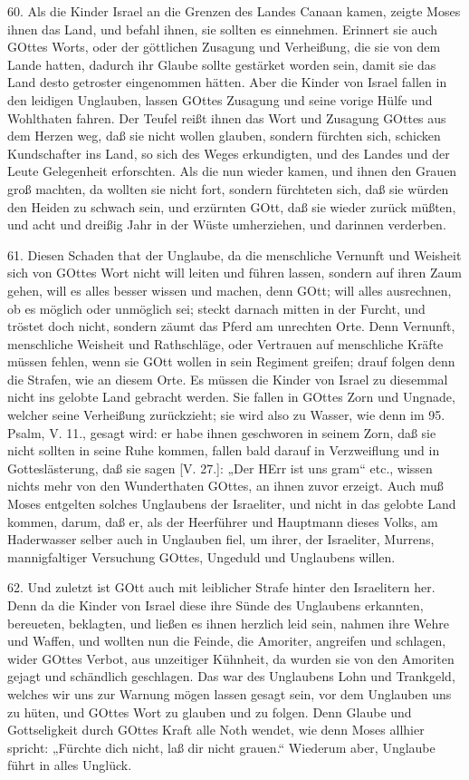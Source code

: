 60. Als die Kinder Israel an die Grenzen des Landes Canaan kamen, zeigte Moses ihnen das Land, und befahl ihnen, sie sollten es einnehmen. Erinnert sie auch GOttes Worts, oder der göttlichen Zusagung und Verheißung, die sie von dem Lande hatten, dadurch ihr Glaube sollte gestärket worden sein, damit sie das Land desto getroster eingenommen hätten. Aber die Kinder von Israel fallen in den leidigen Unglauben, lassen GOttes Zusagung und seine vorige Hülfe und Wohlthaten fahren. Der Teufel reißt ihnen das Wort und Zusagung GOttes aus dem Herzen weg, daß sie nicht wollen glauben, sondern fürchten sich, schicken Kundschafter ins Land, so sich des Weges erkundigten, und des Landes und der Leute Gelegenheit erforschten. Als die nun wieder kamen, und ihnen den Grauen groß machten, da wollten sie nicht fort, sondern fürchteten sich, daß sie würden den Heiden zu schwach sein, und erzürnten GOtt, daß sie wieder zurück müßten, und acht und dreißig Jahr in der Wüste umherziehen, und darinnen verderben.

61. Diesen Schaden that der Unglaube, da die menschliche Vernunft und Weisheit sich von GOttes Wort nicht will leiten und führen lassen, sondern auf ihren Zaum gehen, will es alles besser wissen und machen, denn GOtt; will alles ausrechnen, ob es möglich oder unmöglich sei; steckt darnach mitten in der Furcht, und tröstet doch nicht, sondern zäumt das Pferd am unrechten Orte. Denn Vernunft, menschliche Weisheit und Rathschläge, oder Vertrauen auf menschliche Kräfte müssen fehlen, wenn sie GOtt wollen in sein Regiment greifen; drauf folgen denn
die Strafen, wie an diesem Orte. Es müssen die Kinder von Israel zu diesemmal nicht ins gelobte Land gebracht werden. Sie fallen in GOttes Zorn und Ungnade, welcher seine Verheißung zurückzieht; sie wird also zu Wasser, wie denn im 95. Psalm, V. 11., gesagt wird: er habe ihnen geschworen in seinem Zorn, daß sie nicht sollten in seine Ruhe kommen, fallen bald darauf in Verzweiflung und in Gotteslästerung, daß sie sagen [V. 27.]: „Der HErr ist uns gram“ etc., wissen nichts mehr von den Wunderthaten GOttes, an ihnen zuvor erzeigt. Auch muß Moses entgelten solches Unglaubens der Israeliter, und nicht in das gelobte Land kommen, darum, daß er, als der Heerführer und Hauptmann dieses Volks, am Haderwasser selber auch in Unglauben fiel, um ihrer, der Israeliter, Murrens, mannigfaltiger Versuchung GOttes, Ungeduld und Unglaubens willen.

62. Und zuletzt ist GOtt auch mit leiblicher Strafe hinter den Israelitern her. Denn da die Kinder von Israel diese ihre Sünde des Unglaubens erkannten, bereueten, beklagten, und ließen es ihnen herzlich leid sein, nahmen ihre Wehre und Waffen, und wollten nun die Feinde, die Amoriter, angreifen und schlagen, wider GOttes Verbot, aus unzeitiger Kühnheit, da wurden sie von den Amoriten gejagt und schändlich geschlagen. Das war des Unglaubens Lohn und Trankgeld, welches wir uns zur Warnung mögen lassen gesagt sein, vor dem Unglauben uns zu hüten, und GOttes Wort zu glauben und zu folgen. Denn Glaube und Gottseligkeit durch GOttes Kraft alle Noth wendet, wie denn Moses allhier spricht: „Fürchte dich nicht, laß dir nicht grauen.“ Wiederum aber, Unglaube führt in alles Unglück.

